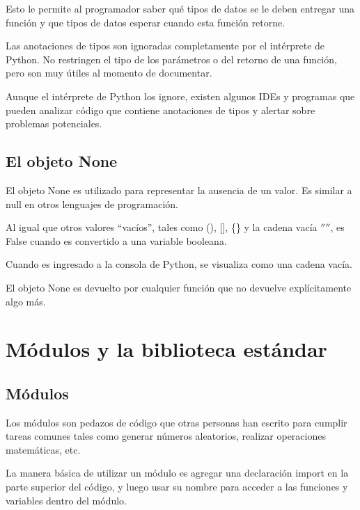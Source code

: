 \documentclass{report}
\newcommand{\doble}[1]{``#1''}
\begin{document}
{Esto le permite al programador saber qué tipos de datos se le deben entregar una función y que tipos de datos esperar cuando esta función retorne.

Las anotaciones de tipos son ignoradas completamente por el intérprete de Python. No restringen el tipo de los parámetros o del retorno de una función, pero son muy útiles al momento de documentar.


Aunque el intérprete de Python los ignore, existen algunos IDEs y programas que pueden analizar código que contiene anotaciones de tipos y alertar sobre problemas potenciales.

\section{El objeto None}

El objeto None es utilizado para representar la ausencia de un valor. Es similar a null en otros lenguajes de programación.

Al igual que otros valores \doble{vacíos}, tales como (), [], \{\} y la cadena vacía $''$$''$, es False cuando es convertido a una variable booleana.


Cuando es ingresado a la consola de Python, se visualiza como una cadena vacía.


El objeto None es devuelto por cualquier función que no devuelve explícitamente algo más.


\clearpage\chapter{Módulos y la biblioteca estándar}

\section{Módulos}

Los módulos son pedazos de código que otras personas han escrito para cumplir tareas comunes tales como generar números aleatorios, realizar operaciones matemáticas, etc.

La manera básica de utilizar un módulo es agregar una declaración import en la parte superior del código, y luego usar su nombre para acceder a las funciones y variables dentro del módulo.

}
\end{document}
